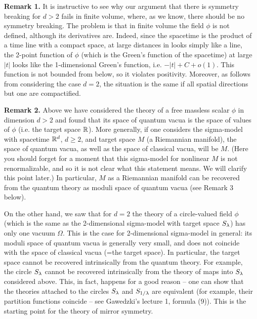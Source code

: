 {\bf Remark 1.} It is instructive to see why our argument 
that there is symmetry breaking for $d>2$ fails in finite 
volume, where, as we know, there should be no symmetry breaking. 
The problem is that in finite volume the field $\phi$ is not defined, 
although its derivatives are. Indeed, 
since the spacetime is the product of a time line with a compact space, 
at large distances in looks simply like a line,
the 2-point function of $\phi$ (which is
the Green's function
of the spacetime) at large $|t|$ looks like the 1-dimensional 
Green's function, i.e. $-|t|+C+o(1)$. This function is not 
bounded from below, so it violates positivity.   
Moreover, as follows from considering 
the case $d=2$, 
the situation is the same if all spatial directions but one are 
compactified.  

{\bf Remark 2.} Above we have considered the theory of a free massless 
scalar $\phi$ in dimension $d>2$ and found that its space
of quantum vacua is the space of values of $\phi$
(i.e. the target space $\Bbb R$). 
More generally, if one considers the sigma-model
with spacetime $\Bbb R^d$, $d\ge 2$, and target space $M$ (a 
Riemannian manifold),
the space of quantum vacua, as well as the space of classical vacua, will be 
$M$. (Here you should forget for a moment that this sigma-model 
for nonlinear $M$ is not renormalizable, and so it is not clear 
what this statement means. We will clarify this point later.)
In particular, $M$ as a Riemannian manifold 
can be recovered from the quantum theory as moduli space 
of quantum vacua (see Remark 3 below). 

On the other hand, we saw that for $d=2$ the theory of a circle-valued 
field $\phi$ (which is the same as the 2-dimensional 
sigma-model with target space $S_\lambda$) has only one vacuum $\Omega$.   
This is the case for 2-dimensional sigma-model in general: its moduli space
of quantum vacua is generally very small, and does not coincide 
with the space of classical vacua (=the target space). In particular,
the target space cannot be recovered intrinsically from the quantum theory. 
For example, the circle $S_\lambda$ cannot be recovered intrinsically 
from the theory of maps into $S_\lambda$ considered above. This, in fact, happens
for a good reason -- one can show that the theories attached to the circles
$S_\lambda$ and $S_{1/\lambda}$ are equivalent (for example, their partition functions
coincide -- see Gawedzki's lecture 1, formula (9)). This is the starting point
for the theory of mirror symmetry.

